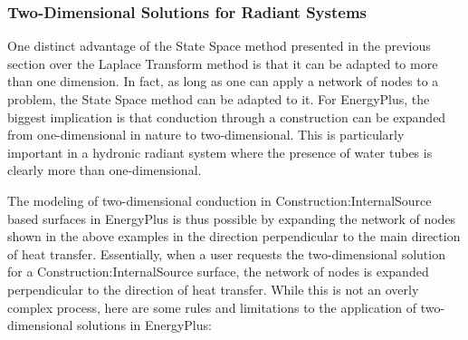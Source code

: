 \subsubsection{Two-Dimensional Solutions for Radiant Systems}\label{two-dimensional-solutions-for-radiant-systems}

One distinct advantage of the State Space method presented in the previous section over the Laplace Transform method is that it can be adapted to more than one dimension.  In fact, as long as one can apply a network of nodes to a problem, the State Space method can be adapted to it.  For EnergyPlus, the biggest implication is that conduction through a construction can be expanded from one-dimensional in nature to two-dimensional.  This is particularly important in a hydronic radiant system where the presence of water tubes is clearly more than one-dimensional.

The modeling of two-dimensional conduction in Construction:InternalSource based surfaces in EnergyPlus is thus possible by expanding the network of nodes shown in the above examples in the direction perpendicular to the main direction of heat transfer.  Essentially, when a user requests the two-dimensional solution for a Construction:InternalSource surface, the network of nodes is expanded perpendicular to the direction of heat transfer.  While this is not an overly complex process, here are some rules and limitations to the application of two-dimensional solutions in EnergyPlus:

